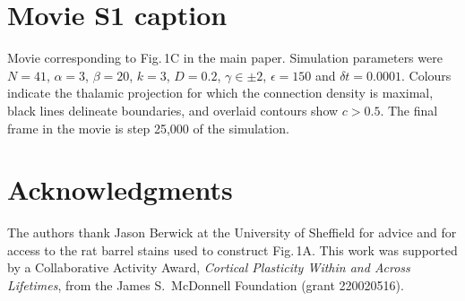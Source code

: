 \documentclass[9pt,lineno]{elife}
\begin{document}


\section{Movie S1 caption}

Movie corresponding to Fig.\,1C in the main paper. Simulation parameters were
$N=41$, $\alpha=3$, $\beta=20$, $k=3$, $D=0.2$, $\gamma\in\pm 2$,
$\epsilon=150$ and $\delta{t}=0.0001$. Colours indicate the thalamic
projection for which the connection density is maximal, black lines delineate
boundaries, and overlaid contours show $c>0.5$. The final frame in the movie
is step 25,000 of the simulation.

\section{Acknowledgments}

The authors thank Jason Berwick at the University of Sheffield for advice and
for access to the rat barrel stains used to construct Fig.\,1A. This work was
supported by a Collaborative Activity Award, \emph{Cortical Plasticity Within
  and Across Lifetimes}, from the James S.~McDonnell Foundation (grant
220020516).


\end{document}
